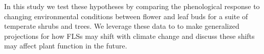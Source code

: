 \documentclass[11pt]{article}
\begin{document}

\noindent In this study we test these hypotheses by comparing the phenological response to changing environmental conditions between flower and leaf buds for a suite of temperate shrubs and trees. We leverage these data to to make generalized projections for how FLSs may shift with climate change and discuss these shifts may affect plant function in the future.\\ 
\end{document}
